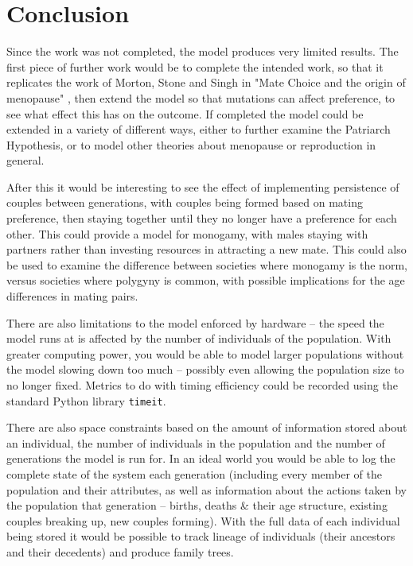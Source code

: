 \documentclass[authoryearcitations]{UoYCSproject}
\begin{document}
\chapter{Conclusion}
\label{cha:Conclusion}
Since the work was not completed, the model produces very limited results. The first piece of further work would be to complete the intended work, so that it replicates the work of Morton, Stone and Singh in "Mate Choice and the origin of menopause" \cite{mateChoice2013}, then extend the model so that mutations can affect preference, to see what effect this has on the outcome. If completed the model could be extended in a variety of different ways, either to further examine the Patriarch Hypothesis, or to model other theories about menopause or reproduction in general.

After this it would be interesting to see the effect of implementing persistence of couples between generations, with couples being formed based on mating preference, then staying together until they no longer have a preference for each other. This could provide a model for monogamy, with males staying with partners rather than investing resources in attracting a new mate. This could also be used to examine the difference between societies where monogamy is the norm, versus societies where polygyny is common, with possible implications for the age differences in mating pairs.

There are also limitations to the model enforced by hardware -- the speed the model runs at is affected by the number of individuals of the population. With greater computing power, you would be able to model larger populations without the model slowing down too much -- possibly even allowing the population size to no longer fixed. Metrics to do with timing efficiency could be recorded using the standard Python library \texttt{timeit}.

There are also space constraints based on the amount of information stored about an individual, the number of individuals in the population and the number of generations the model is run for. In an ideal world you would be able to log the complete state of the system each generation (including every member of the population and their attributes, as well as information about the actions taken by the population that generation -- births, deaths \& their age structure, existing couples breaking up, new couples forming). With the full data of each individual being stored it would be possible to track lineage of individuals (their ancestors and their decedents) and produce family trees. 
\end{document}
